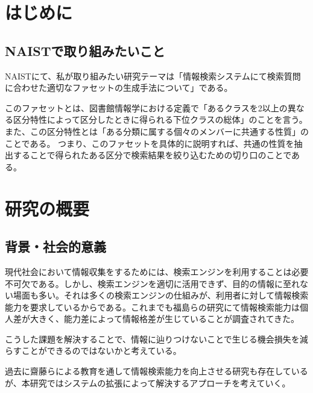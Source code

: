 \documentclass[a4j,10pt, twocolumn]{jarticle} \usepackage[dvipdfmx]{graphicx} \usepackage{amssymb} \usepackage{amsmath}
\begin{document}
\section{はじめに}
\subsection{NAISTで取り組みたいこと}
NAISTにて、私が取り組みたい研究テーマは「情報検索システムにて検索質問に合わせた適切なファセットの生成手法について」である。

このファセットとは、図書館情報学における定義で「あるクラスを2以上の異なる区分特性によって区分したときに得られる下位クラスの総体\cite{libdic}」のことを言う。
また、この区分特性とは「ある分類に属する個々のメンバーに共通する性質」のことである。
つまり、このファセットを具体的に説明すれば、共通の性質を抽出することで得られたある区分で検索結果を絞り込むための切り口のことである。
\section{研究の概要}
\subsection{背景・社会的意義}
 現代社会において情報収集をするためには、検索エンジンを利用することは必要不可欠である。しかし、検索エンジンを適切に活用できず、目的の情報に至れない場面も多い。それは多くの検索エンジンの仕組みが、利用者に対して情報検索能力を要求しているからである。これまでも福島らの研究にて情報検索能力は個人差が大きく、能力差によって情報格差が生じていることが調査されてきた\cite{fukushima}。

 こうした課題を解決することで、情報に辿りつけないことで生じる機会損失を減らすことができるのではないかと考えている。
 
 過去に齋藤らによる教育を通して情報検索能力を向上させる研究\cite{saito}も存在しているが、本研究ではシステムの拡張によって解決するアプローチを考えていく。
\end{document}
